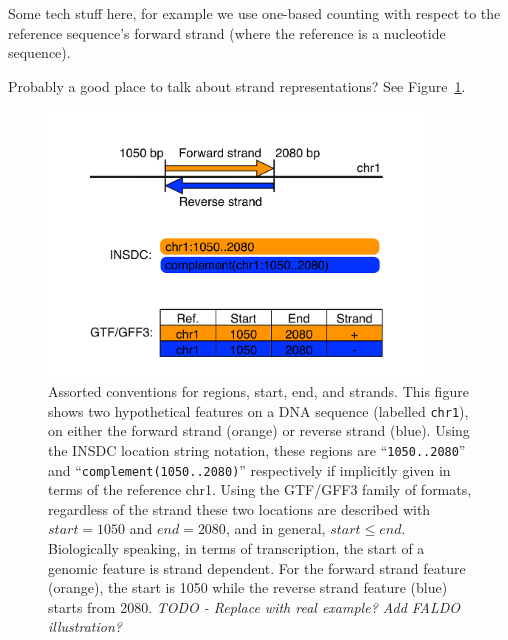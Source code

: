 Some tech stuff here, for example we use one-based counting
with respect to the reference sequence's forward strand
(where the reference is a nucleotide sequence).

Probably a good place to talk about strand representations?
See Figure~\ref{fig:strands}.

\begin{figure}[p]
\begin{center}
\includegraphics[width=10cm]{figures/figure-strand.pdf}
\end{center}
\caption{Assorted conventions for regions, start, end, and strands.
This figure shows two hypothetical features on a DNA sequence
(labelled \texttt{chr1}), on either the forward strand (orange) or
reverse strand (blue).
Using the INSDC location string notation, these regions are
``\texttt{1050..2080}'' and ``\texttt{complement(1050..2080)}''
respectively if implicitly given in terms of the reference chr1.
Using the GTF/GFF3 family of formats, regardless of the
strand these two locations are described with $start = 1050$
and $end = 2080$, and in general, $start \leq end$.
Biologically speaking, in terms of transcription, the start of a genomic
feature is strand dependent.
For the forward strand feature (orange), the start is 1050
while the reverse strand feature (blue) starts from 2080.
\textit{TODO - Replace with real example? Add FALDO illustration?}
}
\label{fig:strands}
\end{figure}
